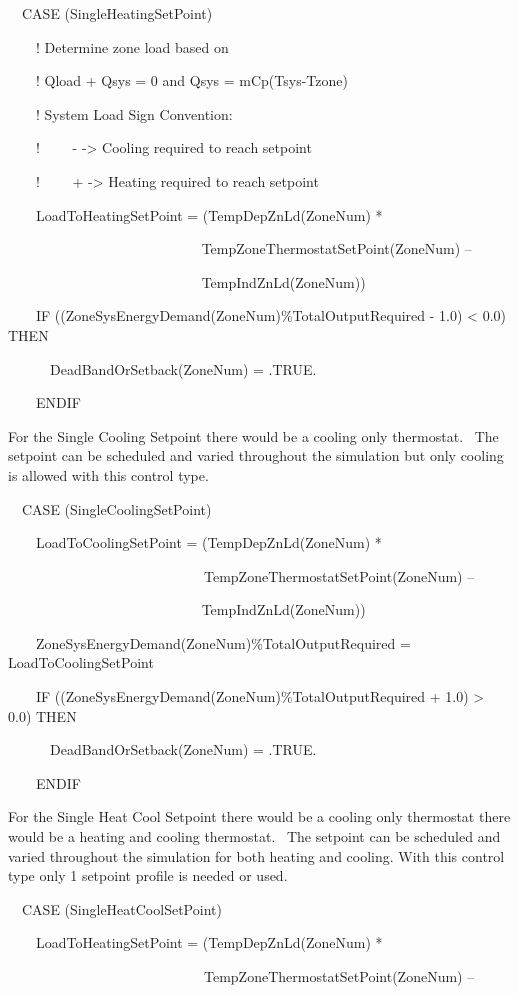 ~~CASE (SingleHeatingSetPoint)

~~~~! Determine zone load based on

~~~~! Qload + Qsys = 0 and Qsys = mCp(Tsys-Tzone)

~~~~! System Load Sign Convention:

~~~~!~~~~ - -\textgreater{} Cooling required to reach setpoint

~~~~!~~~~ + -\textgreater{} Heating required to reach setpoint

~~~~LoadToHeatingSetPoint = (TempDepZnLd(ZoneNum) *

~~~~~~~~~~~~~~~~~~~~~~~~~~~ TempZoneThermostatSetPoint(ZoneNum) --

~~~~~~~~~~~~~~~~~~~~~~~~~~~ TempIndZnLd(ZoneNum))

~~~~IF ((ZoneSysEnergyDemand(ZoneNum)\%TotalOutputRequired - 1.0) \textless{} 0.0) THEN

~~~~~~DeadBandOrSetback(ZoneNum) = .TRUE.

~~~~ENDIF

For the Single Cooling Setpoint there would be a cooling only thermostat.~ The setpoint can be scheduled and varied throughout the simulation but only cooling is allowed with this control type.

~~CASE (SingleCoolingSetPoint)

~~~~LoadToCoolingSetPoint = (TempDepZnLd(ZoneNum) *

~~~~~~~~~~~~~~~~~~~~~~~~~~~~TempZoneThermostatSetPoint(ZoneNum) --

~~~~~~~~~~~~~~~~~~~~~~~~~~~ TempIndZnLd(ZoneNum))

~~~~ZoneSysEnergyDemand(ZoneNum)\%TotalOutputRequired = LoadToCoolingSetPoint

~~~~IF ((ZoneSysEnergyDemand(ZoneNum)\%TotalOutputRequired + 1.0) \textgreater{} 0.0) THEN

~~~~~~DeadBandOrSetback(ZoneNum) = .TRUE.

~~~~ENDIF

For the Single Heat Cool Setpoint there would be a cooling only thermostat there would be a heating and cooling thermostat.~ The setpoint can be scheduled and varied throughout the simulation for both heating and cooling. With this control type only 1 setpoint profile is needed or used.

~~CASE (SingleHeatCoolSetPoint)

~~~~LoadToHeatingSetPoint = (TempDepZnLd(ZoneNum) *

~~~~~~~~~~~~~~~~~~~~~~~~~~~~TempZoneThermostatSetPoint(ZoneNum) --

